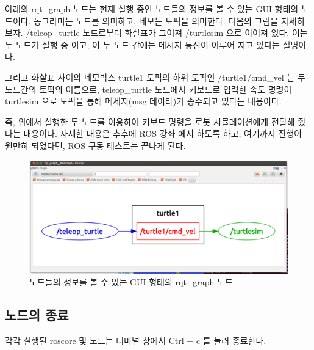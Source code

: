 아래의 rqt\_graph 노드는 현재 실행 중인 노드들의 정보를 볼 수 있는 GUI 형태의 노드이다. 동그라미는 노드를 의미하고, 네모는 토픽을 의미한다. 다음의 그림을 자세히 보자. /teleop\_turtle 노드로부터 화살표가 그어져 /turtlesim 으로 이어져 있다. 이는 두 노드가 실행 중 이고, 이 두 노드 간에는 메시지 통신이 이루어 지고 있다는 설명이다. 

그리고 화살표 사이의 네모박스 turtle1 토픽의 하위 토픽인 /turtle1/cmd\_vel 는 두 노드간의 토픽의 이름으로, teleop\_turtle 노드에서 키보드로 입력한 속도 명령이 turtlesim 으로 토픽을 통해 메세지(msg 데이타)가 송수되고 있다는 내용이다. 

즉, 위에서 실행한 두 노드를 이용하여 키보드 명령을 로봇 시뮬레이션에게 전달해 줬다는 내용이다. 자세한 내용은 추후에 ROS 강좌 에서 하도록 하고, 여기까지 진행이 원만히 되었다면, ROS 구동 테스트는 끝나게 된다.

\begin{figure}[h]
\centering\includegraphics[width=0.8\columnwidth]{pictures/chapter2/turtlesim_node_graph.png}
\caption{노드들의 정보를 볼 수 있는 GUI 형태의 rqt\_graph 노드}
\end{figure}

\subsection{노드의 종료}

각각 실행된 roscore 및 노드는 터미널 창에서 Ctrl + c 를 눌러 종료한다.

